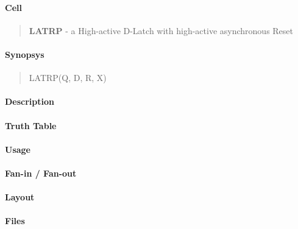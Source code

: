 \label{LATRP}
\paragraph{Cell}
\begin{quote}
    \textbf{LATRP} - a High-active D-Latch with high-active asynchronous Reset
\end{quote}

\paragraph{Synopsys}
\begin{quote}
    LATRP(Q, D, R, X)
\end{quote}

\paragraph{Description}

%

\paragraph{Truth Table}
%

\paragraph{Usage}

\paragraph{Fan-in / Fan-out}

\paragraph{Layout}

\paragraph{Files}
